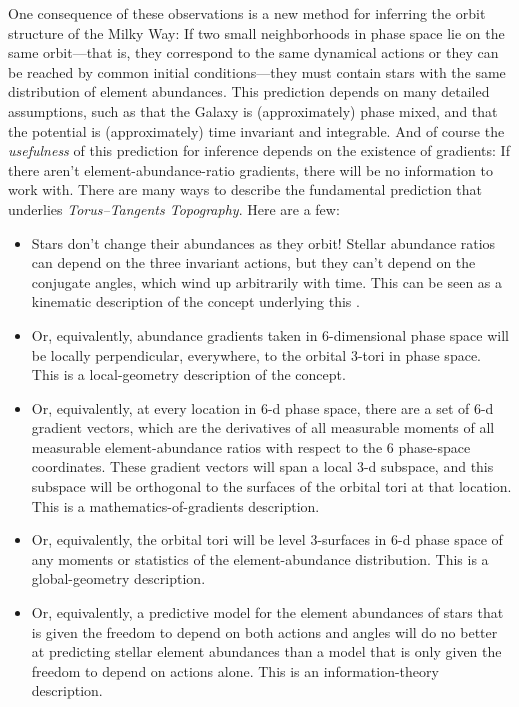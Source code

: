 \documentclass[modern]{aastex63}
\newcommand{\methodname}{\textsl{Torus--Tangents Topography}}
\begin{document}
One consequence of these observations is a new method for inferring
the orbit structure of the Milky Way:
If two small neighborhoods in phase space lie on the same orbit---that
is, they correspond to the same dynamical actions or they can be reached
by common initial conditions---they must contain stars with the same distribution of
element abundances.
This prediction depends on many detailed assumptions, such as that
the Galaxy is (approximately) phase mixed, and that the potential is
(approximately) time invariant and integrable.
And of course the \emph{usefulness} of this prediction for inference
depends on the existence of gradients: If there aren't
element-abundance-ratio gradients, there will be no information to work
with.
There are many ways to describe the fundamental prediction that underlies \methodname.
Here are a few:
\begin{itemize}
\item
  Stars don't change their abundances as they orbit!  Stellar
  abundance ratios can depend on the three invariant actions, but they
  can't depend on the conjugate angles, which wind up arbitrarily with time.
  This can be seen as a kinematic description of the concept underlying this \documentname.
\item
  Or, equivalently, abundance gradients taken in 6-dimensional phase space will be
  locally perpendicular, everywhere, to the orbital 3-tori in phase space.
  This is a local-geometry description of the concept.
\item
  Or, equivalently, at every location in 6-d phase space, there are a set of 6-d
  gradient vectors, which are the derivatives of all measurable
  moments of all measurable element-abundance ratios with respect to
  the 6 phase-space coordinates. These gradient vectors will span a
  local 3-d subspace, and this subspace will be orthogonal to the surfaces
  of the orbital tori at that location.
  This is a mathematics-of-gradients description.
\item
  Or, equivalently, the orbital tori will be level 3-surfaces in 6-d phase space of any
  moments or statistics of the element-abundance distribution.
  This is a global-geometry description.
\item
  Or, equivalently, a predictive model for the element abundances of stars
  that is given the freedom to depend on both actions and angles will do no
  better at predicting stellar element abundances than a model that is only
  given the freedom to depend on actions alone.
  This is an information-theory description.
\end{itemize}
\end{document}
